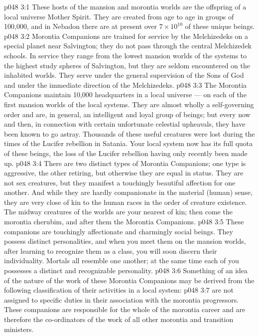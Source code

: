 \vs p048 3:1 These hosts of the mansion and morontia worlds are the offspring of a local universe Mother Spirit. They are created from age to age in groups of 100,000, and in Nebadon there are at present over $7 \times 10^{10}$ of these unique beings.
\vs p048 3:2 Morontia Companions are trained for service by the Melchizedeks on a special planet near Salvington; they do not pass through the central Melchizedek schools. In service they range from the lowest mansion worlds of the systems to the highest study spheres of Salvington, but they are seldom encountered on the inhabited worlds. They serve under the general supervision of the Sons of God and under the immediate direction of the Melchizedeks.
\vs p048 3:3 The Morontia Companions maintain 10,000 headquarters in a local universe --- on each of the first mansion worlds of the local systems. They are almost wholly a self\hyp{}governing order and are, in general, an intelligent and loyal group of beings; but every now and then, in connection with certain unfortunate celestial upheavals, they have been known to go astray. Thousands of these useful creatures were lost during the times of the Lucifer rebellion in Satania. Your local system now has its full quota of these beings, the loss of the Lucifer rebellion having only recently been made up.
\vs p048 3:4 \pc There are two distinct types of Morontia Companions; one type is aggressive, the other retiring, but otherwise they are equal in status. They are not sex creatures, but they manifest a touchingly beautiful affection for one another. And while they are hardly companionate in the material (human) sense, they are very close of kin to the human races in the order of creature existence. The midway creatures of the worlds are your nearest of kin; then come the morontia cherubim, and after them the Morontia Companions.
\vs p048 3:5 These companions are touchingly affectionate and charmingly social beings. They possess distinct personalities, and when you meet them on the mansion worlds, after learning to recognize them as a class, you will soon discern their individuality. Mortals all resemble one another; at the same time each of you possesses a distinct and recognizable personality.
\vs p048 3:6 \pc Something of an idea of the nature of the work of these Morontia Companions may be derived from the following classification of their activities in a local system:
\vs p048 3:7 \bibnobreakspace {} are not assigned to specific duties in their association with the morontia progressors. These companions are responsible for the whole of the morontia career and are therefore the co\hyp{}ordinators of the work of all other morontia and transition ministers.
